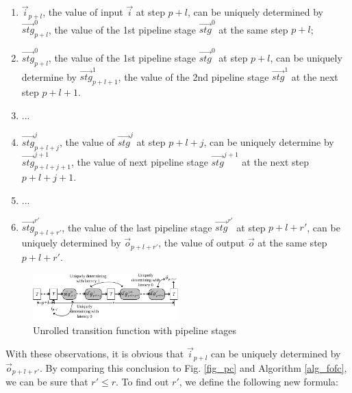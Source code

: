 \documentclass[conference]{IEEEtran}
\begin{document}
\begin{enumerate}
\item $\vec{i}_{p+l}$,
the value of input $\vec{i}$ at step $p+l$,
can be uniquely determined by $\vec{stg}^0_{p+l}$,
the value of  the 1st pipeline stage $\vec{stg}^0$ at the same step $p+l$;
 \item $\vec{stg}^0_{p+l}$,
the value of the 1st pipeline stage $\vec{stg}^0$ at step $p+l$,
can be uniquely determine by $\vec{stg}^{1}_{p+l+1}$,
the value of the 2nd pipeline stage $\vec{stg}^{1}$ at the next step $p+l+1$.
 \item ...
 \item $\vec{stg}^{j}_{p+l+j}$,
 the value of $\vec{stg}^{j}$ at step $p+l+j$,
 can be uniquely determine by $\vec{stg}^{j+1}_{p+l+j+1}$,
 the value of next pipeline stage $\vec{stg}^{j+1}$ at the next step $p+l+j+1$.
 \item ...
 \item $\vec{stg}^{r'}_{p+l+r'}$,
 the value of the last pipeline stage $\vec{stg}^{r'}$ at step $p+l+r'$,
 can be uniquely determined by $\vec{o}_{p+l+r'}$,
 the value of output $\vec{o}$ at the same step $p+l+r'$.
\end{enumerate}



\begin{figure}[b]
\begin{center}
\includegraphics[width=0.5\textwidth]{encexp}
\end{center}
\caption{Unrolled transition function with pipeline stages}
  \label{fig_encexp}
\end{figure}

With these observations,
it is obvious that $\vec{i}_{p+l}$ can be uniquely determined by $\vec{o}_{p+l+r'}$.
By comparing this conclusion to Fig. \ref{fig_pc} and Algorithm \ref{alg_fofc},
we can be sure that $r'\le r$.
To find out $r'$, 
we define the following new formula:



\end{document}
